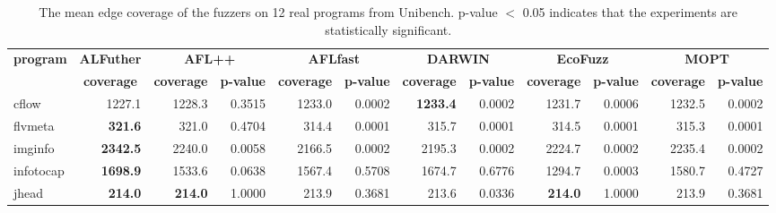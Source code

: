 \documentclass[lettersize,journal]{IEEEtran}
\begin{document}
\begin{table}[t!]
	\centering
	\caption{The mean edge coverage of the fuzzers on 12 real programs from Unibench. p-value $<$ 0.05 indicates that the experiments are statistically significant.}
	\begin{tabular}{lccccccccccr}
		\toprule
		\multicolumn{1}{c}{\multirow{2}[4]{*}{\textbf{program}}} & \textbf{ALFuther} & \multicolumn{2}{c}{\textbf{AFL++}} & \multicolumn{2}{c}{\textbf{AFLfast}} & \multicolumn{2}{c}{\textbf{DARWIN}} & \multicolumn{2}{c}{\textbf{EcoFuzz}} & \multicolumn{2}{c}{\textbf{MOPT}} \\
		\cmidrule{2-12}          & \textbf{coverage} & \textbf{coverage} & \textbf{p-value} & \textbf{coverage} & \textbf{p-value} & \textbf{coverage} & \textbf{p-value} & \textbf{coverage} & \textbf{p-value} & \textbf{coverage} & \multicolumn{1}{c}{\textbf{p-value}} \\
		\midrule
		cflow & \multicolumn{1}{r}{1227.1} & \multicolumn{1}{r}{1228.3 } & \multicolumn{1}{r}{0.3515 } & \multicolumn{1}{r}{1233.0 } & \multicolumn{1}{r}{0.0002 } & \multicolumn{1}{r}{\textbf{1233.4 }} & \multicolumn{1}{r}{0.0002 } & \multicolumn{1}{r}{1231.7 } & \multicolumn{1}{r}{0.0006 } & \multicolumn{1}{r}{1232.5 } & 0.0002  \\
		flvmeta & \multicolumn{1}{r}{\textbf{321.6}} & \multicolumn{1}{r}{321.0 } & \multicolumn{1}{r}{0.4704 } & \multicolumn{1}{r}{314.4 } & \multicolumn{1}{r}{0.0001 } & \multicolumn{1}{r}{315.7 } & \multicolumn{1}{r}{0.0001 } & \multicolumn{1}{r}{314.5 } & \multicolumn{1}{r}{0.0001 } & \multicolumn{1}{r}{315.3 } & 0.0001  \\
		imginfo & \multicolumn{1}{r}{\textbf{2342.5}} & \multicolumn{1}{r}{2240.0 } & \multicolumn{1}{r}{0.0058 } & \multicolumn{1}{r}{2166.5 } & \multicolumn{1}{r}{0.0002 } & \multicolumn{1}{r}{2195.3 } & \multicolumn{1}{r}{0.0002 } & \multicolumn{1}{r}{2224.7 } & \multicolumn{1}{r}{0.0002 } & \multicolumn{1}{r}{2235.4 } & 0.0002  \\
		infotocap & \multicolumn{1}{r}{\textbf{1698.9}} & \multicolumn{1}{r}{1533.6 } & \multicolumn{1}{r}{0.0638 } & \multicolumn{1}{r}{1567.4 } & \multicolumn{1}{r}{0.5708 } & \multicolumn{1}{r}{1674.7 } & \multicolumn{1}{r}{0.6776 } & \multicolumn{1}{r}{1294.7 } & \multicolumn{1}{r}{0.0003 } & \multicolumn{1}{r}{1580.7 } & 0.4727  \\
		jhead & \multicolumn{1}{r}{\textbf{214.0}} & \multicolumn{1}{r}{\textbf{214.0 }} & \multicolumn{1}{r}{1.0000 } & \multicolumn{1}{r}{213.9 } & \multicolumn{1}{r}{0.3681 } & \multicolumn{1}{r}{213.6 } & \multicolumn{1}{r}{0.0336 } & \multicolumn{1}{r}{\textbf{214.0 }} & \multicolumn{1}{r}{1.0000 } & \multicolumn{1}{r}{213.9 } & 0.3681  \\

\end{tabular}
\end{table}
\end{document}
